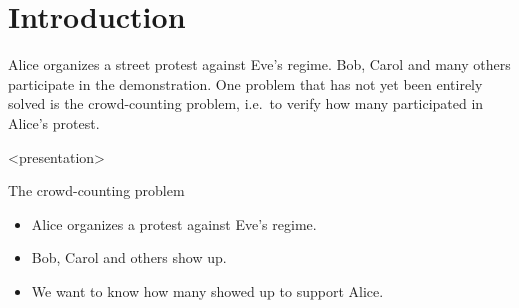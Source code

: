 \mode*

\section{Introduction}%
\label{Introduction}

Alice organizes a street protest against Eve's regime.
Bob, Carol and many others participate in the demonstration.
One problem that has not yet been entirely solved is the crowd-counting 
problem, i.e.\ to verify how many participated in Alice's protest.


\begin{frame}<presentation>
  \begin{block}{The crowd-counting problem}
    \begin{itemize}
      \item Alice organizes a protest against Eve's regime.
      \item Bob, Carol and others show up.
      \item We want to know how many showed up to support Alice.
    \end{itemize}
  \end{block}
\end{frame}


